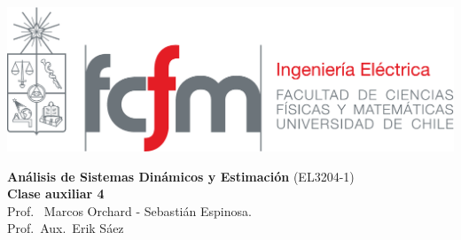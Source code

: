 \documentclass[
  11pt,
  letterpaper,
   addpoints,
   answers
  ]{exam}
\begin{document}
\pagestyle{headandfoot}
\firstpageheader{}{}{}
\runningheader{}{}{}
\firstpagefooter{}{\thepage}{}
\runningfooter{}{\thepage}{}

\noindent
\begin{minipage}{0.47\textwidth}
\includegraphics[width=\textwidth]{../fcfm_die}
\end{minipage}
\begin{minipage}{0.53\textwidth}
\begin{center}
\large\textbf{Análisis de Sistemas Dinámicos y Estimación} (EL3204-1) \\
\large\textbf{Clase auxiliar 4} \\
\normalsize Prof.~ Marcos Orchard - Sebastián Espinosa.\\
\normalsize Prof.~Aux.~Erik Sáez
\end{center}
\end{minipage}

\vspace{0.5cm}
\noindent
\vspace{.85cm}
\end{document}
